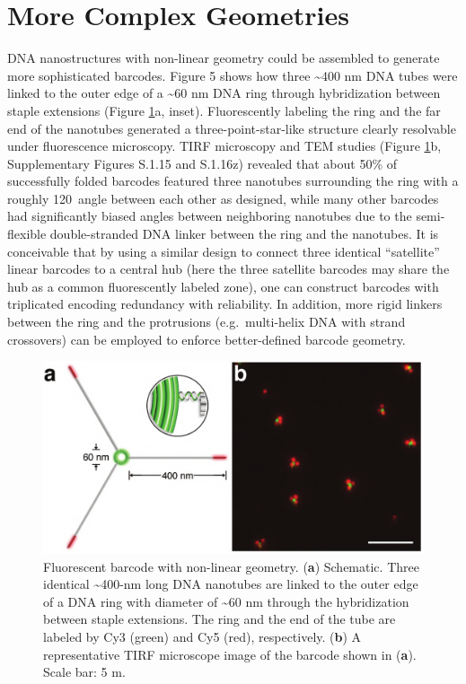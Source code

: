 \section{More Complex Geometries}
DNA nanostructures with non-linear geometry could be assembled to generate 
more sophisticated barcodes. Figure 5 shows how three \textasciitilde400 nm DNA 
tubes were linked to the outer edge of a \textasciitilde60 nm DNA ring through hybridization between 
 staple extensions (Figure \ref{fig:dna5}a, inset). Fluorescently labeling the ring and the far end of 
the nanotubes generated a three-point-star-like structure clearly resolvable under 
fluorescence microscopy. TIRF microscopy and TEM studies (Figure \ref{fig:dna5}b, Supplementary Figures S.1.15 and S.1.16z) revealed that about 50\% of successfully folded barcodes featured three nanotubes 
surrounding the ring with a roughly 120\textdegree~angle between each other as designed, while 
many other barcodes had significantly biased angles between neighboring nanotubes due 
to the semi-flexible double-stranded DNA linker between the ring and the nanotubes. It is 
conceivable that by using a similar design to connect three identical ``satellite'' linear barcodes 
to a central hub (here the three satellite barcodes may share the hub as a common 
fluorescently labeled zone), one can construct barcodes with triplicated encoding 
redundancy with reliability. In addition, more rigid linkers between 
the ring and the protrusions (e.g.~multi-helix DNA with strand crossovers) can be 
employed to enforce better-defined barcode geometry. 


\begin{figure} %
\includegraphics[width=\textwidth]{figures/dna5}
\caption[Fluorescent barcode with non-linear geometry.]{Fluorescent barcode with non-linear geometry. (\textbf{a}) Schematic. Three identical 
\textasciitilde400-nm long DNA nanotubes are linked to the outer edge of a DNA ring with diameter 
of \textasciitilde60 nm through the hybridization between staple extensions. The ring and the end of 
the tube are labeled by Cy3 (green) and Cy5 (red), respectively. (\textbf{b}) A representative 
TIRF microscope image of the barcode shown in (\textbf{a}). Scale bar: 5 \textmu m. 
\label{fig:dna5}}
\end{figure}
\afterpage{\clearpage}



